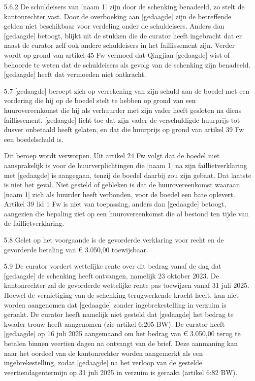 \documentclass[
  dutch,
  a4paper,
]{article}
\begin{document}
5.6.2 De schuldeisers van {[}naam 1{]} zijn door de schenking benadeeld, zo stelt de kantonrechter vast. Door de overboeking aan {[}gedaagde{]} zijn de betreffende gelden niet beschikbaar voor verdeling onder de schuldeisers. Anders dan {[}gedaagde{]} betoogt, blijkt uit de stukken die de curator heeft ingebracht dat er naast de curator zelf ook andere schuldeisers in het faillissement zijn. Verder wordt op grond van artikel 45 Fw vermoed dat Qingjian {[}gedaagde{]} wist of behoorde te weten dat de schuldeisers als gevolg van de schenking zijn benadeeld. {[}gedaagde{]} heeft dat vermoeden niet ontkracht.

5.7 {[}gedaagde{]} beroept zich op verrekening van zijn schuld aan de boedel met een vordering die hij op de boedel stelt te hebben op grond van een huurovereenkomst die hij als verhuurder met zijn vader heeft gesloten na diens faillissement. {[}gedaagde{]} licht toe dat zijn vader de verschuldigde huurprijs tot dusver onbetaald heeft gelaten, en dat die huurprijs op grond van artikel 39 Fw een boedelschuld is.

Dit beroep wordt verworpen. Uit artikel 24 Fw volgt dat de boedel niet aansprakelijk is voor de huurverplichtingen die {[}naam 1{]} na zijn faillietverklaring met {[}gedaagde{]} is aangegaan, tenzij de boedel daarbij zou zijn gebaat. Dat laatste is niet het geval. Niet gesteld of gebleken is dat de huurovereenkomst waaraan {[}naam 1{]} zich als huurder heeft verbonden, voor de boedel een bate oplevert. Artikel 39 lid 1 Fw is niet van toepassing, anders dan {[}gedaagde{]} betoogt, aangezien die bepaling ziet op een huurovereenkomst die al bestond ten tijde van de faillietverklaring.

5.8 Gelet op het voorgaande is de gevorderde verklaring voor recht en de gevorderde betaling van € 3.050,00 toewijsbaar.

5.9 De curator vordert wettelijke rente over dit bedrag vanaf de dag dat {[}gedaagde{]} de schenking heeft ontvangen, namelijk 23 oktober 2023. De kantonrechter zal de gevorderde wettelijke rente pas toewijzen vanaf 31 juli 2025. Hoewel de vernietiging van de schenking terugwerkende kracht heeft, kan niet worden aangenomen dat {[}gedaagde{]} zonder ingebrekestelling in verzuim is geraakt. De curator heeft namelijk niet gesteld dat {[}gedaagde{]} het bedrag te kwader trouw heeft aangenomen (zie artikel 6:205 BW). De curator heeft {[}gedaagde{]} op 16 juli 2025 aangemaand om het bedrag van € 3.050,00 terug te betalen binnen veertien dagen na ontvangt van de brief. Deze aanmaning kan naar het oordeel van de kantonrechter worden aangemerkt als een ingebrekestelling, zodat {[}gedaagde{]} na het verloop van de gestelde veertiendagentermijn op 31 juli 2025 in verzuim is geraakt (artikel 6:82 BW).
\end{document}
